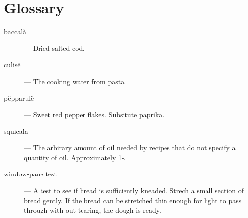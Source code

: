 \documentclass{book}
\begin{document}
\def\ThisFile{rcp:ToastingNuts}



\chapter{Glossary}
\begin{description}
\item[baccal\`a] --- Dried salted cod.
\item[culis\"e] --- The cooking water from pasta.
\item[p\"epparul\"e] --- Sweet red pepper flakes. Subsitute paprika.
\item[squicala] --- The arbirary amount of oil needed by recipes that do not specify a quantity of oil. Approximately 1-.
\item[window-pane test] --- A test to see if bread is sufficiently kneaded. Strech a small section of bread gently. If the bread can be stretched thin enough for light to pass through with out tearing, the dough is ready.
\end{description}

\printindex
\end{document}
